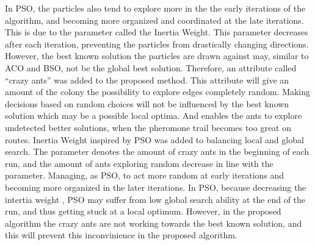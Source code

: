 In PSO, the particles also tend to explore more in the the early iterations of the algorithm, and becoming more organized and coordinated at the late iterations. This is due to the parameter called the Inertia Weight. This parameter decreases after each iteration, preventing the particles from drastically changing directions. However, the best known solution the particles are drawn against may, similar to ACO and BSO, not be the global best solution. Therefore, an attribute called ``crazy ants'' was added to the proposed method. This attribute  will give an amount of the colony the possibility to explore edges completely random. Making decisions based on random choices will not be influenced by the best known solution which may be a possible local optima. And enables the ants to explore undetected better solutions, when the pheromone trail becomes too great on routes. Inertia Weight inspired by PSO was added to balancing local and global search. The parameter denotes the amount of crazy ants in the beginning of each run, and the amount of ants exploring random decrease in line with the parameter. Managing, as PSO, to act more random at early iterations and becoming more organized in the later iterations. In PSO, because decreasing the intertia weight , PSO may suffer from low global search ability at the end of the run, and thus getting stuck at a local optimum. However, in the proposed algorithm the crazy ants are not working towards the best known solution, and this will prevent this inconvinience in the proposed algorithm.




